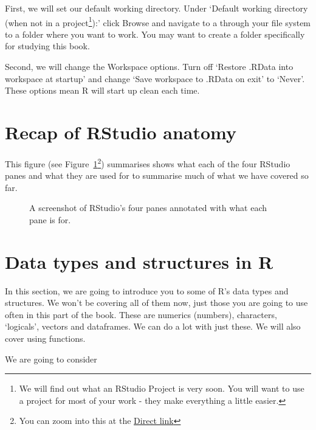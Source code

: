 \documentclass[
  letterpaper,
  DIV=11,
  numbers=noendperiod]{scrreprt}
\begin{document}
First, we will set our default working directory. Under `Default working
directory (when not in a project\footnote{We will find out what an
  RStudio Project is very soon. You will want to use a project for most
  of your work - they make everything a little easier.}):' click Browse
and navigate to a through your file system to a folder where you want to
work. You may want to create a folder specifically for studying this
book.

Second, we will change the Workspace options. Turn off `Restore .RData
into workspace at startup' and change `Save workspace to .RData on exit'
to `Never'. These options mean R will start up clean each time.

\hypertarget{recap-of-rstudio-anatomy}{%
\section{Recap of RStudio anatomy}\label{recap-of-rstudio-anatomy}}

This figure (see Figure~\ref{fig-rstudio-anatomy}\footnote{You can zoom
  into this at the
  \href{https://www-users.york.ac.uk/~er13/RStudio\%20Anatomy.svg}{Direct
  link}}) summarises shows what each of the four RStudio panes and what
they are used for to summarise much of what we have covered so far.

\begin{figure}

{\centering 

}

\caption{\label{fig-rstudio-anatomy}A screenshot of RStudio's four panes
annotated with what each pane is for.}

\end{figure}

\hypertarget{data-types-and-structures-in-r}{%
\section{Data types and structures in
R}\label{data-types-and-structures-in-r}}

In this section, we are going to introduce you to some of R's data types
and structures. We won't be covering all of them now, just those you are
going to use often in this part of the book. These are numerics
(numbers), characters, `logicals', vectors and dataframes. We can do a
lot with just these. We will also cover using functions.

We are going to consider
\end{document}
